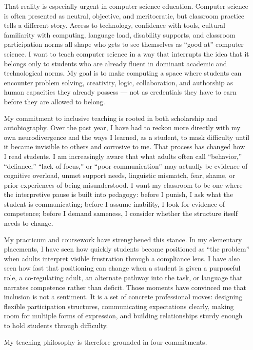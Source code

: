 \documentclass[12pt]{article}
\begin{document}
That reality is especially urgent in computer science education. Computer science is often presented as neutral, objective, and meritocratic, but classroom practice tells a different story. Access to technology, confidence with tools, cultural familiarity with computing, language load, disability supports, and classroom participation norms all shape who gets to see themselves as ``good at'' computer science. I want to teach computer science in a way that interrupts the idea that it belongs only to students who are already fluent in dominant academic and technological norms. My goal is to make computing a space where students can encounter problem solving, creativity, logic, collaboration, and authorship as human capacities they already possess --- not as credentials they have to earn before they are allowed to belong.

My commitment to inclusive teaching is rooted in both scholarship and autobiography. Over the past year, I have had to reckon more directly with my own neurodivergence and the ways I learned, as a student, to mask difficulty until it became invisible to others and corrosive to me. That process has changed how I read students. I am increasingly aware that what adults often call ``behavior,'' ``defiance,'' ``lack of focus,'' or ``poor communication'' may actually be evidence of cognitive overload, unmet support needs, linguistic mismatch, fear, shame, or prior experiences of being misunderstood. I want my classroom to be one where the interpretive pause is built into pedagogy: before I punish, I ask what the student is communicating; before I assume inability, I look for evidence of competence; before I demand sameness, I consider whether the structure itself needs to change.

My practicum and coursework have strengthened this stance. In my elementary placements, I have seen how quickly students become positioned as ``the problem'' when adults interpret visible frustration through a compliance lens. I have also seen how fast that positioning can change when a student is given a purposeful role, a co-regulating adult, an alternate pathway into the task, or language that narrates competence rather than deficit. Those moments have convinced me that inclusion is not a sentiment. It is a set of concrete professional moves: designing flexible participation structures, communicating expectations clearly, making room for multiple forms of expression, and building relationships sturdy enough to hold students through difficulty.

My teaching philosophy is therefore grounded in four commitments.
\end{document}
